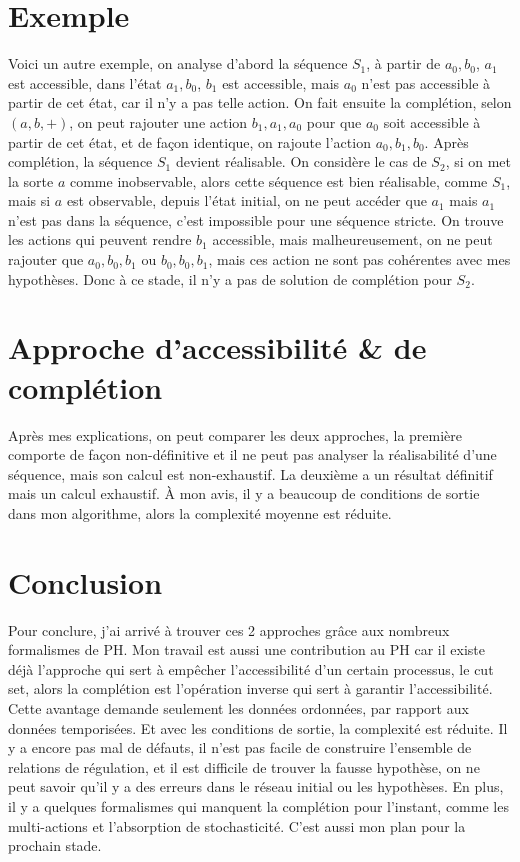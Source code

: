 \documentclass[french,12pt]{article}
\begin{document}
\section{Exemple}
Voici un autre exemple, on analyse d'abord la séquence $S_1$, à partir de $a_0,b_0$, $a_1$ est accessible, dans l'état $a_1,b_0$, $b_1$ est accessible, mais $a_0$ n'est pas accessible à partir de cet état, car il n'y a pas telle action. On fait ensuite la complétion, selon $(a,b,+)$, on peut rajouter une action $b_1,a_1,a_0$ pour que $a_0$ soit accessible à partir de cet état, et de façon identique, on rajoute l'action $a_0,b_1,b_0$. Après complétion, la séquence $S_1$ devient réalisable. On considère le cas de $S_2$, si on met la sorte $a$ comme inobservable, alors cette séquence est bien réalisable, comme $S_1$, mais si $a$ est observable, depuis l'état initial, on ne peut accéder que $a_1$ mais $a_1$ n'est pas dans la séquence, c'est impossible pour une séquence stricte. On trouve les actions qui peuvent rendre $b_1$ accessible, mais malheureusement, on ne peut rajouter que $a_0,b_0,b_1$ ou $b_0,b_0,b_1$, mais ces action ne sont pas cohérentes avec mes hypothèses. Donc à ce stade, il n'y a pas de solution de complétion pour $S_2$. 
\section{Approche d'accessibilité \& de complétion}
Après mes explications, on peut comparer les deux approches, la première comporte de façon non-définitive et il ne peut pas analyser la réalisabilité d'une séquence, mais son calcul est non-exhaustif. La deuxième a un résultat définitif mais un calcul exhaustif. À mon avis, il y a beaucoup de conditions de sortie dans mon algorithme, alors la complexité moyenne est réduite.  
\section{Conclusion}
Pour conclure, j'ai arrivé à trouver ces 2 approches grâce aux nombreux formalismes de PH. Mon travail est aussi une contribution au PH car il existe déjà l'approche qui sert à empêcher l'accessibilité d'un certain processus, le cut set, alors la complétion est l'opération inverse qui sert à garantir l'accessibilité. Cette avantage demande seulement les données ordonnées, par rapport aux données temporisées. Et avec les conditions de sortie, la complexité est réduite.
Il y a encore pas mal de défauts, il n'est pas facile de construire l'ensemble de relations de régulation, et il est difficile de trouver la fausse hypothèse, on ne peut savoir qu'il y a des erreurs dans le réseau initial ou les hypothèses. En plus, il y a quelques formalismes qui manquent la complétion pour l'instant, comme les multi-actions et l'absorption de stochasticité. C'est aussi mon plan pour la prochain stade. 
\end{document}
